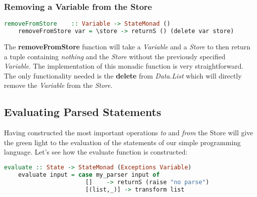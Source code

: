 \documentclass[a4paper, onecolumn]{article}
\begin{document}
    \subsubsection{Removing a Variable from the Store}
    
    \begin{tcolorbox}
    \begin{lstlisting}[language=Haskell] 
    removeFromStore    :: Variable -> StateMonad () 
    removeFromStore var = \store -> returnS () (delete var store) 
    \end{lstlisting}
    \end{tcolorbox}
    
    \noindent The \textbf{removeFromStore} function will take a \textit{Variable} and a \textit{Store} to then return a tuple containing \textit{nothing} and the \textit{Store} without the previously specified \textit{Variable}. The implementation of this monadic function is very straightforward. The only functionality needed is the \textbf{delete} from \textit{Data.List} which will directly remove the \textit{Variable} from the \textit{Store}.  
    
    \subsection{Evaluating Parsed Statements}
    
    Having constructed the most important operations \textit{to} and \textit{from} the Store will give the green light to the evaluation of the statements of our simple programming language. Let's see how the evaluate function is constructed: 
    
    \begin{tcolorbox}
    \begin{lstlisting}[language=Haskell] 
    evaluate :: State -> StateMonad (Exceptions Variable)
    evaluate input = case my_parser input of
                       []    -> returnS (raise "no parse") 
                       [(list,_)] -> transform list
    \end{lstlisting}
    \end{tcolorbox}
    
\end{document}

